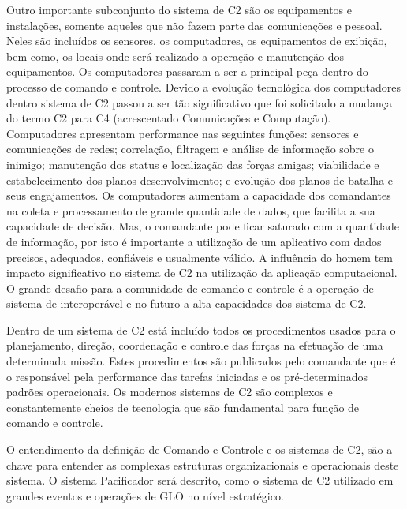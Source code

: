 Outro importante subconjunto do sistema de C2 são os equipamentos e instalações, somente aqueles que não fazem parte das comunicações e pessoal. Neles são incluídos os sensores, os computadores, os equipamentos de exibição, bem como, os locais onde será realizado a operação e manutenção dos equipamentos. Os computadores passaram a ser a principal peça dentro do processo de comando e controle. Devido a evolução tecnológica dos computadores dentro sistema de C2 passou a ser tão significativo que foi solicitado a mudança do termo C2 para C4 (acrescentado Comunicações e Computação). Computadores apresentam performance nas seguintes funções: sensores e comunicações de redes; correlação, filtragem e análise de informação sobre o inimigo; manutenção dos status e localização das forças amigas; viabilidade e estabelecimento dos planos desenvolvimento; e evolução dos planos de batalha e seus engajamentos. Os computadores aumentam a capacidade dos comandantes na coleta e processamento de grande quantidade de dados, que facilita a sua capacidade de decisão. Mas, o comandante pode ficar saturado com a quantidade de informação, por isto é importante a utilização de um aplicativo com dados precisos, adequados, confiáveis e usualmente válido. A influência do homem tem impacto significativo no sistema de C2 na utilização da aplicação computacional. O grande desafio para a comunidade de comando e controle é a operação de sistema de interoperável e no futuro a alta capacidades dos sistema de C2.

Dentro de um sistema de C2 está incluído todos os procedimentos usados para o planejamento, direção, coordenação e controle das forças na efetuação de uma determinada missão. Estes procedimentos são publicados pelo comandante que é o responsável pela performance das tarefas iniciadas e os pré-determinados padrões operacionais. Os modernos sistemas de C2 são complexos e constantemente cheios de tecnologia que são fundamental para função de comando e controle.

O entendimento da definição de Comando e Controle e os sistemas de C2, são a chave para entender as complexas estruturas organizacionais e operacionais deste sistema. O sistema Pacificador será descrito, como o sistema de C2 utilizado em grandes eventos e operações de GLO no nível estratégico. 

